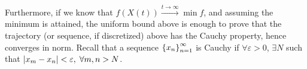 Furthermore, if we know that $f(X(t)) \overset{t \to \infty}{\to} \min f$, and
assuming the minimum is attained, the uniform bound above is enough to prove
that the trajectory (or sequence, if discretized) above has the Cauchy
property, hence converges in norm. Recall that a sequence
$\left\{ x_n \right\}_{n=1}^{\infty}$ is Cauchy if $\forall \varepsilon > 0$, $\exists N$
such that $\left| x_m - x_n \right| < \varepsilon, \; \forall m, n > N$.
